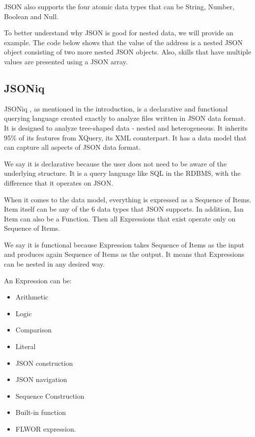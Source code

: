 JSON also supports the four atomic data types that can be String, Number, Boolean and Null.

To better understand why JSON is good for nested data, we will provide an example. The code below shows that the value of the address is a nested JSON object consisting of two more nested JSON objects. Also, skills that have multiple values are presented using a JSON array.



\subsection{JSONiq}
\label{sec:JSONiq}
JSONiq \cite{JSONiqPaper}, as mentioned in the introduction, is a declarative and functional querying language created exactly to analyze files written in JSON data format. It is designed to analyze tree-shaped data - nested and heterogeneous. It inherits 95\% of its features from XQuery, its XML counterpart. It has a data model that can capture all aspects of JSON data format. 

We say it is declarative because the user does not need to be aware of the underlying structure. It is a query language like SQL in the RDBMS, with the difference that it operates on JSON.

When it comes to the data model, everything is expressed as a Sequence of Items. Item itself can be any of the 6 data types that JSON supports. In addition, Ian Item can also be a Function. Then all Expressions that exist operate only on Sequence of Items. 

We say it is functional because Expression takes Sequence of Items as the input and produces again Sequence of Items as the output. It means that Expressions can be nested in any desired way.

An Expression can be: 
\begin{itemize}
	\item Arithmetic
	\item Logic
	\item Comparison
	\item Literal
	\item JSON construction
	\item JSON navigation
	\item Sequence Construction
	\item Built-in function
	\item FLWOR expression.
\end{itemize} 

